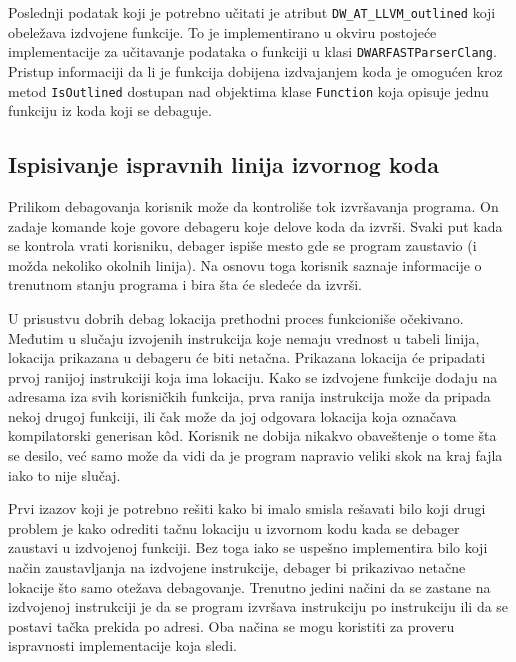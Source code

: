\documentclass[12pt,oneside]{memoir}
\begin{document}
Poslednji podatak koji je potrebno učitati je atribut \verb|DW_AT_LLVM_outlined| koji obeležava izdvojene funkcije.
To je implementirano u okviru postojeće implementacije za učitavanje podataka o funkciji u klasi \verb|DWARFASTParserClang|.
Pristup informaciji da li je funkcija dobijena izdvajanjem koda je omogućen kroz metod \verb|IsOutlined| dostupan nad objektima klase \verb|Function| koja opisuje jednu funkciju iz koda koji se debaguje.

\subsection{Ispisivanje ispravnih linija izvornog koda}

\label{sec:debugger_line_number}

Prilikom debagovanja korisnik može da kontroliše tok izvršavanja programa.
On zadaje komande koje govore debageru koje delove koda da izvrši.
Svaki put kada se kontrola vrati korisniku, debager ispiše mesto gde se program zaustavio (i možda nekoliko okolnih linija).
Na osnovu toga korisnik saznaje informacije o trenutnom stanju programa i bira šta će sledeće da izvrši.

U prisustvu dobrih debag lokacija prethodni proces funkcioniše očekivano.
Međutim u slučaju izvojenih instrukcija koje nemaju vrednost u tabeli linija, lokacija prikazana u debageru će biti netačna.
Prikazana lokacija će pripadati prvoj ranijoj instrukciji koja ima lokaciju.
Kako se izdvojene funkcije dodaju na adresama iza svih korisničkih funkcija, prva ranija instrukcija može da pripada nekoj drugoj funkciji, ili čak može da joj odgovara lokacija koja označava kompilatorski generisan k\^od.
Korisnik ne dobija nikakvo obaveštenje o tome šta se desilo, već samo može da vidi da je program napravio veliki skok na kraj fajla iako to nije slučaj.


Prvi izazov koji je potrebno rešiti kako bi imalo smisla rešavati bilo koji drugi problem je kako odrediti tačnu lokaciju u izvornom kodu kada se debager zaustavi u izdvojenoj funkciji.
Bez toga iako se uspešno implementira bilo koji način zaustavljanja na izdvojene instrukcije, debager bi prikazivao netačne lokacije što samo otežava debagovanje.
Trenutno jedini načini da se zastane na izdvojenoj instrukciji je da se program izvršava instrukciju po instrukciju ili da se postavi tačka prekida po adresi.
Oba načina se mogu koristiti za proveru ispravnosti implementacije koja sledi.
\end{document}
